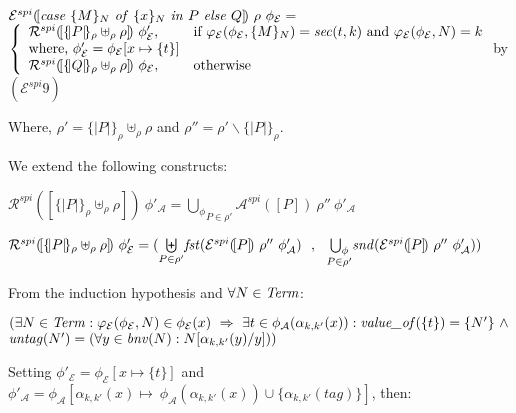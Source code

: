 \documentclass[10pt,a4paper,final,oneside,fleqn]{book}
\begin{document}
\noindent
$\mathcal{E}^{spi}(\![\mbox{{\itshape case\/} }\{M\}_N\mbox{ {\itshape of\/} }\{x\}_N\mbox{ {\itshape in\/} }P\mbox{ {\itshape else\/} }Q]\!)~\rho~\phi_\mathcal{E}=$\\
$\left\{\begin{array}{ll} \mathcal{R}^{spi}(\![\{\!|P|\!\}_\rho\uplus_\rho\rho]\!)~\phi'_\mathcal{E},&\mbox{if }\varphi_\mathcal{E}(\phi_\mathcal{E},\{M\}_N)=\mbox{{\itshape sec\/}}(t,k)\mbox{ and }\varphi_\mathcal{E}(\phi_\mathcal{E},N)=k\\
\mbox{where, }\phi'_\mathcal{E}=\phi_\mathcal{E}[x\mapsto\{t\}]&\\
\mathcal{R}^{spi}(\![\{\!|Q|\!\}_\rho\uplus_\rho\rho]\!)~\phi_\mathcal{E},&\mbox{otherwise}\\
\end{array}\right.$\hfill by $(\mathcal{E}^{spi} 9)$\vspace{5mm}

\noindent
Where, $\rho'=\{\!|P|\!\}_\rho\uplus_\rho\rho$ and $\rho''=\rho'\backslash\{\!|P|\!\}_\rho$.\vspace{5mm}

\noindent
We extend the following constructs:

\noindent
$\mathcal{R}^{spi}(\![\{\!|P|\!\}_\rho\uplus_\rho\rho]\!)~\phi'_\mathcal{A}=\underset{P\in\rho'}{\bigcup_\phi}\mathcal{A}^{spi}(\![P]\!)~\rho''~\phi'_\mathcal{A}$

\noindent
$\mathcal{R}^{spi}(\![\{\!|P|\!\}_\rho\uplus_\rho\rho]\!)~\phi'_\mathcal{E}=(\underset{P\in\rho'}{\biguplus}\mbox{{\itshape fst\/}}(\mathcal{E}^{spi}(\![P]\!)~\rho''~\phi'_\mathcal{A})~~,~~\underset{P\in\rho'}{\bigcup_\phi}\mbox{{\itshape snd\/}}(\mathcal{E}^{spi}(\![P]\!)~\rho''~\phi'_\mathcal{A}))$\vspace{5mm}

\noindent
From the induction hypothesis and $\forall N\in\mbox{{\itshape Term\/}}$:

\noindent
$(\exists N\in\mbox{{\itshape Term\/}}:\varphi_\mathcal{E}(\phi_\mathcal{E},N)\in\phi_\mathcal{E}(x)~\Rightarrow~\exists t\in\phi_\mathcal{A}(\alpha_{k,k'}(x)):\mbox{{\itshape value\_of\/}}(\{t\})=\{N'\}~\wedge$\\
$\mbox{{\itshape untag\/}}(N')=(\forall y\in\mbox{{\itshape bnv\/}}(N):N[\alpha_{k,k'}(y)/y]))$\vspace{5mm}


\noindent
Setting $\phi'_\mathcal{E}=\phi_\mathcal{E}[x\mapsto\{t\}]$ and $\phi'_\mathcal{A}=\phi_\mathcal{A}[\alpha_{k,k'}(x)\mapsto~\phi_\mathcal{A}(\alpha_{k,k'}(x))\cup\{\alpha_{k,k'}({tag})\}]$, then:
\end{document}
